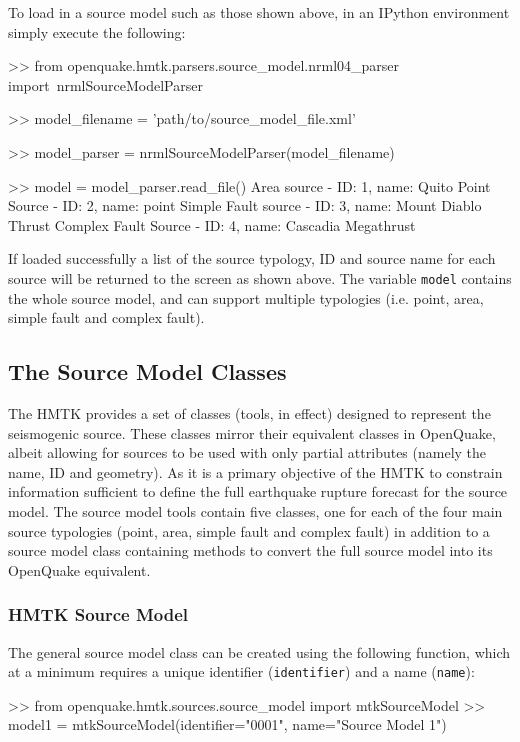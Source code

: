 To load in a source model such as those shown above, in an IPython environment simply execute the following:

\begin{python}[frame=single]
>> from openquake.hmtk.parsers.source_model.nrml04_parser import\
    nrmlSourceModelParser

>> model_filename = 'path/to/source_model_file.xml'

>> model_parser = nrmlSourceModelParser(model_filename)

>> model = model_parser.read_file()
Area source - ID: 1, name: Quito
Point Source - ID: 2, name: point
Simple Fault source - ID: 3, name: Mount Diablo Thrust
Complex Fault Source - ID: 4, name: Cascadia Megathrust
\end{python}

If loaded successfully a list of the source typology, ID and source name for each source will be returned to the screen as shown above. The variable \verb=model= contains the whole source model, and can support multiple typologies (i.e. point, area, simple fault and complex fault).

\subsection{The Source Model Classes}

The HMTK provides a set of classes (tools, in effect) designed to represent the seismogenic source. These classes mirror their equivalent classes in OpenQuake, albeit allowing for sources to be used with only partial attributes (namely the name, ID and geometry). As it is a primary objective of the HMTK to constrain information sufficient to define the full earthquake rupture forecast for the source model. The source model tools contain five classes, one for each of the four main source typologies (point, area, simple fault and complex fault) in addition to a source model class containing methods to convert the full source model into its OpenQuake equivalent.

\subsubsection{HMTK Source Model}

The general source model class can be created using the following function, which at a minimum requires a unique identifier (\verb=identifier=) and a name (\verb=name=):

\begin{python}[frame=single]
>> from openquake.hmtk.sources.source_model import mtkSourceModel
>> model1 = mtkSourceModel(identifier="0001",
                           name="Source Model 1")
\end{python}

